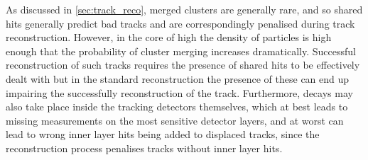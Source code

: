 As discussed in \cref{sec:track_reco}, merged clusters are generally rare, and so shared hits generally predict bad tracks and are correspondingly penalised during track reconstruction.
However, in the core of high \pT \bjets the density of particles is high enough that the probability of cluster merging increases dramatically.
Successful reconstruction of such tracks requires the presence of shared hits to be effectively dealt with but in the standard reconstruction the presence of these can end up impairing the successfully reconstruction of the track.
Furthermore, decays may also take place inside the tracking detectors themselves, which at best leads to missing measurements on the most sensitive detector layers, and at worst can lead to wrong inner layer hits being added to displaced tracks, since the reconstruction process penalises tracks without inner layer hits.

